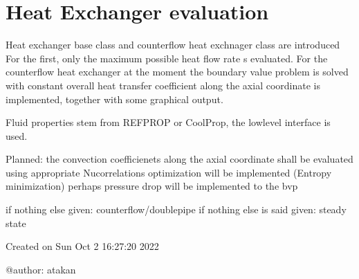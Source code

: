 \documentclass[letterpaper,10pt,english]{sphinxmanual}
\begin{document}
\sphinxstepscope


\chapter{Heat Exchanger evaluation}
\label{\detokenize{heat_exchanger:module-heat_exchanger}}\label{\detokenize{heat_exchanger:heat-exchanger-evaluation}}\label{\detokenize{heat_exchanger::doc}}\label{\detokenize{heat_exchanger:module-0}}
\sphinxAtStartPar
Heat exchanger base class
and counterflow heat exchnager class are introduced
For the first, only the maximum possible heat flow rate s evaluated.
For the counterflow heat exchanger at the moment the boundary value problem
is solved with constant overall heat transfer coefficient  along the axial
coordinate is implemented, together with some graphical output.

\sphinxAtStartPar
Fluid properties stem from REFPROP or CoolProp, the low\sphinxhyphen{}level interface is used.

\sphinxAtStartPar
Planned:
\sphinxhyphen{}the convection coefficienets along the axial coordinate
shall be evaluated using appropriate Nu\sphinxhyphen{}correlations
\sphinxhyphen{} optimization will be implemented (Entropy minimization)
\sphinxhyphen{} perhaps pressure drop will be implemented to the bvp

\sphinxAtStartPar
if nothing else given: counterflow/double\sphinxhyphen{}pipe
if nothing else is said given: steady state

\sphinxAtStartPar
Created on Sun Oct  2 16:27:20 2022

\sphinxAtStartPar
@author: atakan
\end{document}
